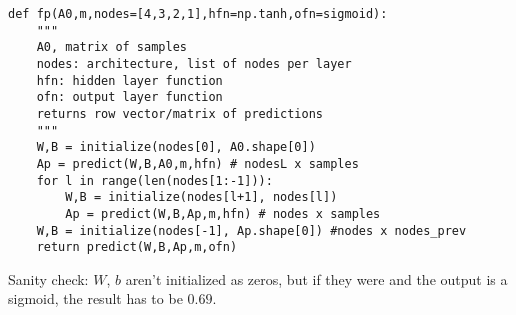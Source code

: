 \begin{center}
\begin{BVerbatim}
def fp(A0,m,nodes=[4,3,2,1],hfn=np.tanh,ofn=sigmoid):
    """
    A0, matrix of samples
    nodes: architecture, list of nodes per layer
    hfn: hidden layer function
    ofn: output layer function
    returns row vector/matrix of predictions
    """
    W,B = initialize(nodes[0], A0.shape[0]) 
    Ap = predict(W,B,A0,m,hfn) # nodesL x samples
    for l in range(len(nodes[1:-1])):
        W,B = initialize(nodes[l+1], nodes[l]) 
        Ap = predict(W,B,Ap,m,hfn) # nodes x samples 
    W,B = initialize(nodes[-1], Ap.shape[0]) #nodes x nodes_prev
    return predict(W,B,Ap,m,ofn)
\end{BVerbatim}
\end{center}
Sanity check: $W$, $b$ aren't initialized as zeros, but if they were and the output is a sigmoid, the result has to be $0.69$.

